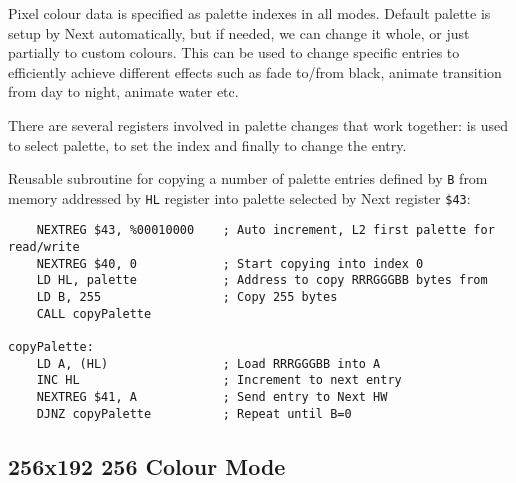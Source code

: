 \documentclass[12pt,twoside,openright,a4paper]{book}
\begin{document}
Pixel colour data is specified as palette indexes in all modes. Default palette is setup by Next automatically, but if needed, we can change it whole, or just partially to custom colours. This can be used to change specific entries to efficiently achieve different effects such as fade to/from black, animate transition from day to night, animate water etc.

There are several registers involved in palette changes that work together:  is used to select palette,  to set the index and finally  to change the entry.

Reusable subroutine for copying a number of palette entries defined by {\tt B} from memory addressed by {\tt HL} register into palette selected by Next register {\tt \$43}:

\begin{Verbatim}
	NEXTREG $43, %00010000    ; Auto increment, L2 first palette for read/write
	NEXTREG $40, 0            ; Start copying into index 0
	LD HL, palette            ; Address to copy RRRGGGBB bytes from
	LD B, 255                 ; Copy 255 bytes
	CALL copyPalette

copyPalette:
	LD A, (HL)                ; Load RRRGGGBB into A
	INC HL                    ; Increment to next entry
	NEXTREG $41, A            ; Send entry to Next HW
	DJNZ copyPalette          ; Repeat until B=0
\end{Verbatim}


\pagebreak
\subsection{256x192 256 Colour Mode}
\end{document}
